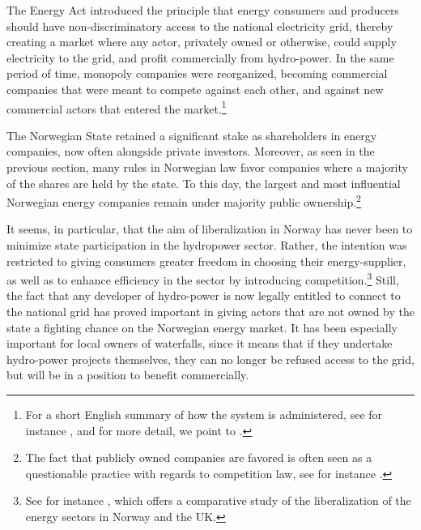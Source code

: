The Energy Act introduced the principle that energy consumers and producers should have non-discriminatory access to the national electricity grid, thereby creating a market where any actor, privately owned or otherwise, could supply electricity to the grid, and profit commercially from hydro-power. In the same period of time, monopoly companies were reorganized, becoming commercial companies that were meant to compete against each other, and against new commercial actors that entered the market.\footnote{For a short English summary of how the system is administered, see for instance \cite[p.29-30]{ar2010}, and for more detail, we point to \cite{Hammer2}.}

The Norwegian State retained a significant stake as shareholders in energy companies, now often alongside private investors. Moreover, as seen in the previous section, many rules in Norwegian law favor companies where a majority of the shares are held by the state. To this day, the largest and most influential Norwegian energy companies remain under majority public ownership.\footnote{The fact that publicly owned companies are favored is often seen as a questionable practice with regards to competition law, see for instance \cite{efta07}.} 


It seems, in particular, that the aim of liberalization in Norway has never been to minimize state participation in the hydropower sector. Rather, the intention was restricted to giving consumers greater freedom in choosing their energy-supplier, as well as to enhance efficiency in the sector by introducing competition.\footnote{See for instance \cite{liberal}, which offers a comparative study of the liberalization of the energy sectors in Norway and the UK.} Still, the fact that any developer of hydro-power is now legally entitled to connect to the national grid has proved important in giving actors that are not owned by the state a fighting chance on the Norwegian energy market. It has been especially important for local owners of waterfalls, since it means that if they undertake hydro-power projects themselves, they can no longer be refused access to the grid, but will be in a position to benefit commercially.

